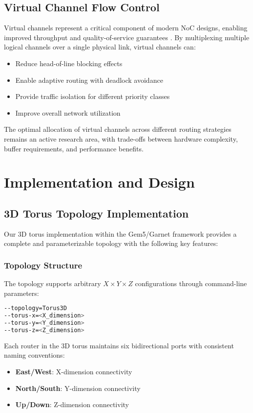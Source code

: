 \documentclass[a4paper,12pt]{article}
\begin{document}
\subsection{Virtual Channel Flow Control}

Virtual channels represent a critical component of modern NoC designs, enabling improved throughput and quality-of-service guarantees \cite{dally1992virtual}. By multiplexing multiple logical channels over a single physical link, virtual channels can:

\begin{itemize}
    \item Reduce head-of-line blocking effects
    \item Enable adaptive routing with deadlock avoidance
    \item Provide traffic isolation for different priority classes
    \item Improve overall network utilization
\end{itemize}

The optimal allocation of virtual channels across different routing strategies remains an active research area, with trade-offs between hardware complexity, buffer requirements, and performance benefits.

\section{Implementation and Design}

\subsection{3D Torus Topology Implementation}

Our 3D torus implementation within the Gem5/Garnet framework provides a complete and parameterizable topology with the following key features:

\subsubsection{Topology Structure}
The topology supports arbitrary $X \times Y \times Z$ configurations through command-line parameters:
\begin{lstlisting}[language=bash, caption=3D Torus Configuration Parameters]
--topology=Torus3D
--torus-x=<X_dimension>
--torus-y=<Y_dimension>
--torus-z=<Z_dimension>
\end{lstlisting}

Each router in the 3D torus maintains six bidirectional ports with consistent naming conventions:
\begin{itemize}
    \item \textbf{East/West}: X-dimension connectivity
    \item \textbf{North/South}: Y-dimension connectivity
    \item \textbf{Up/Down}: Z-dimension connectivity
\end{itemize}
\end{document}
